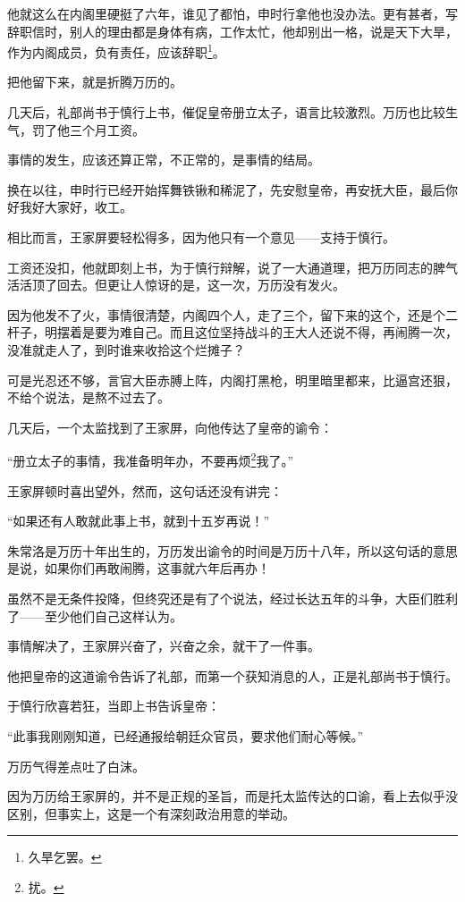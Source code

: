 \begin{multicols}{\theparacolNo}
		他就这么在内阁里硬挺了六年，谁见了都怕，申时行拿他也没办法。更有甚者，写辞职信时，别人的理由都是身体有病，工作太忙，他却别出一格，说是天下大旱，作为内阁成员，负有责任，应该辞职\footnote{久旱乞罢。}。

		把他留下来，就是折腾万历的。

		几天后，礼部尚书于慎行上书，催促皇帝册立太子，语言比较激烈。万历也比较生气，罚了他三个月工资。

		事情的发生，应该还算正常，不正常的，是事情的结局。

		换在以往，申时行已经开始挥舞铁锹和稀泥了，先安慰皇帝，再安抚大臣，最后你好我好大家好，收工。

		相比而言，王家屏要轻松得多，因为他只有一个意见——支持于慎行。

		工资还没扣，他就即刻上书，为于慎行辩解，说了一大通道理，把万历同志的脾气活活顶了回去。但更让人惊讶的是，这一次，万历没有发火。

		因为他发不了火，事情很清楚，内阁四个人，走了三个，留下来的这个，还是个二杆子，明摆着是要为难自己。而且这位坚持战斗的王大人还说不得，再闹腾一次，没准就走人了，到时谁来收拾这个烂摊子？

		可是光忍还不够，言官大臣赤膊上阵，内阁打黑枪，明里暗里都来，比逼宫还狠，不给个说法，是熬不过去了。

		几天后，一个太监找到了王家屏，向他传达了皇帝的谕令：

		“册立太子的事情，我准备明年办，不要再烦\footnote{扰。}我了。”

		王家屏顿时喜出望外，然而，这句话还没有讲完：

		“如果还有人敢就此事上书，就到十五岁再说！”

		朱常洛是万历十年出生的，万历发出谕令的时间是万历十八年，所以这句话的意思是说，如果你们再敢闹腾，这事就六年后再办！

		虽然不是无条件投降，但终究还是有了个说法，经过长达五年的斗争，大臣们胜利了——至少他们自己这样认为。

		事情解决了，王家屏兴奋了，兴奋之余，就干了一件事。

		他把皇帝的这道谕令告诉了礼部，而第一个获知消息的人，正是礼部尚书于慎行。

		于慎行欣喜若狂，当即上书告诉皇帝：

		“此事我刚刚知道，已经通报给朝廷众官员，要求他们耐心等候。”

		万历气得差点吐了白沫。

		因为万历给王家屏的，并不是正规的圣旨，而是托太监传达的口谕，看上去似乎没区别，但事实上，这是一个有深刻政治用意的举动。


\end{multicols}

